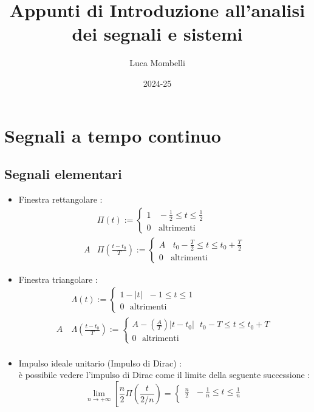 \documentclass{article}
\title{Appunti di Introduzione all'analisi dei segnali e sistemi   }
\author{Luca Mombelli}
\date{2024-25}
\theoremstyle{definition}
\begin{document}
	\maketitle
	\newpage
	\tableofcontents
	\newpage
	
\section{Segnali a tempo continuo}
\subsection{Segnali elementari }
\begin{itemize}
\item Finestra rettangolare : 
\begin{align*}
	&\Pi(t):=\begin{cases}
	1  \ \ \ \ - \frac{1}{2} \leq t \leq  \frac{1}{2} \\
	0 \ \ \ \ \text{altrimenti}
	\end{cases} \\ 
	A& \Pi(\frac{t-t_0}{T}):=\begin{cases}
A \ \ \ \ t_0 - \frac{T}{2} \leq t \leq t_0 + \frac{T}{2} \\
0 \ \ \ \ \text{altrimenti}
	\end{cases}
\end{align*} 
\item Finestra triangolare : 
\begin{align*}
&\Lambda(t):=\begin{cases}
1-|t|  \ \ \ -1 \leq t \leq 1 \\
0 \ \ \ \text{altrimenti}
\end{cases}\\
A \ &\Lambda(\frac{t-t_0}{T}):=\begin{cases}
	A-(\frac{A}{T})|t-t_0|  \ \ \ t_0-T \leq t \leq t_0+T\\
	0 \ \ \ \text{altrimenti}
\end{cases}\\
\end{align*}
\item Impulso ideale unitario (Impulso di Dirac) : \\ 
è possibile vedere l'impulso di Dirac come il limite della seguente successione :
$$\lim_{n\rightarrow +\infty} \left[ \frac{n}{2} \Pi \left(\frac{t}{2/n}\right)=\begin{cases}
	\frac{n}{2} \ \ \ -\frac{1}{n}\leq t \leq \frac{1}{n}\\

\end{cases}$$
\end{itemize}
\end{document}

